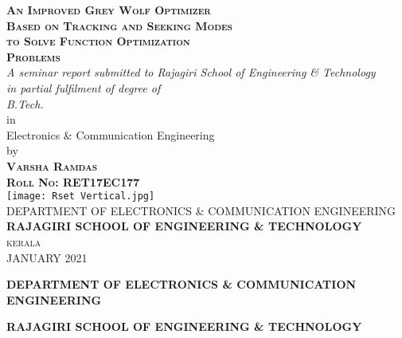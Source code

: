 \documentclass[11pt]{report}
\begin{document}
\begin{titlepage}

\newcommand{\HRule}{\rule{\linewidth}{0.5mm}}

\center %
 
\textsc{\Large \textbf{An Improved Grey Wolf Optimizer \\[0.25cm]Based on Tracking and
Seeking Modes\\[0.25cm] to Solve Function Optimization \\[0.25cm]Problems}}\\[0.75cm] %

{ \it A seminar report submitted to Rajagiri School of Engineering \& Technology\\ in partial fulfilment of degree of \\[0.75cm]B.Tech.\\[0.5cm]}{in\\[0.5cm] Electronics \& Communication Engineering\\[0.75cm]by}\\[0.5cm]\textsc{\textbf{Varsha Ramdas \\[0.35cm]Roll No: RET17EC177}}\\[1cm] %


\texttt{[image: Rset Vertical.jpg]}\\[1cm]
 
\textsc{DEPARTMENT OF ELECTRONICS \& COMMUNICATION ENGINEERING\\[0.15cm]\textsc{\textbf{RAJAGIRI SCHOOL OF ENGINEERING \& TECHNOLOGY}}\\[0.15cm]kerala\\[0.15cm]}{JANUARY 2021}

\end{titlepage}

\vfill %
\thispagestyle{empty}

\vspace*{-0.3cm}
\begin{center}
{\large \bf  DEPARTMENT OF ELECTRONICS \& COMMUNICATION ENGINEERING}\vspace{0.1cm}
\end{center}

\begin{center} 
{\Large \bf RAJAGIRI SCHOOL OF ENGINEERING \& TECHNOLOGY}\vspace{0.1cm}
\end{center}
\end{document}
